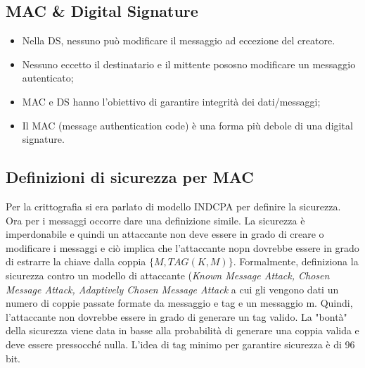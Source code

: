 \documentclass{article}
\theoremstyle{remark}
\begin{document}
\subsection{MAC \& Digital Signature}
\begin{itemize}
	\item Nella DS, nessuno può modificare il messaggio ad eccezione del creatore.
	\item Nessuno eccetto il destinatario e il mittente pososno modificare un messaggio autenticato;
	\item MAC e DS hanno l'obiettivo di garantire integrità dei dati/messaggi;
	\item Il MAC (message authentication code) è una forma più debole di una digital signature.
\end{itemize}
\subsection{Definizioni di sicurezza per MAC}
Per la crittografia si era parlato di modello INDCPA per definire la sicurezza. Ora per i messaggi occorre dare una definizione simile.
La sicurezza è imperdonabile e quindi un attaccante non deve essere in grado di creare o modificare i messaggi e ciò implica che l'attaccante nopn dovrebbe essere in grado di estrarre la chiave dalla coppia $\{M,TAG(K,M)\}$.
Formalmente, definiziona la sicurezza contro un modello di attaccante (\emph{Known Message Attack, Chosen Message Attack, Adaptively Chosen Message Attack} a cui gli vengono dati un numero di coppie passate formate da messaggio e tag e un messaggio m. Quindi, l'attaccante non dovrebbe essere in grado di generare un tag valido. La "bontà" della sicurezza viene data in basse alla probabilità di generare una coppia valida e deve essere pressocché nulla.
L'idea di tag minimo per garantire sicurezza è di 96 bit.
\end{document}
